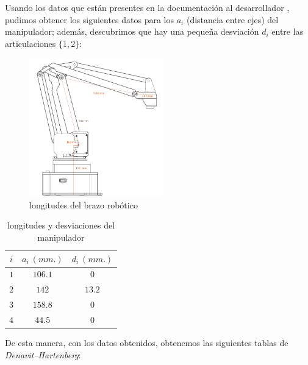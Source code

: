 \documentclass[a4paper,12pt]{article}
\begin{document}
Usando los datos que están presentes en la documentación al desarrollador \cite{developer_guide_uarm},
pudimos obtener los siguientes datos para los $a_i$ (distancia entre ejes) del manipulador; además,
descubrimos que hay una pequeña desviación $d_i$ entre las articulaciones $\{1, 2\}$:
\begin{figure}[H]
    \centering
    \includegraphics[height=6cm]{images/sizes.png}
    \caption{longitudes del brazo robótico \cite{developer_guide_uarm}}
    \label{fig:sizes}
\end{figure}

\begin{table}[H]
    \centering
    \begin{tabular}{|| c | c c ||}
        \hline
        $i$ & $a_i~(mm.)$ & $d_i~(mm.)$ \\ [0.5ex]
        \hline\hline
        $1$ & $106.1$ & $0$ \\
        \hline
        $2$ & $142$ & $13.2$ \\
        \hline
        $3$ & $158.8$ & $0$ \\
        \hline
        $4$ & $44.5$ & $0$ \\ [1ex]
        \hline
    \end{tabular}
    \caption{longitudes y desviaciones del manipulador}
\end{table}

De esta manera, con los datos obtenidos, obtenemos las siguientes tablas de \textit{Denavit–Hartenberg}:
\end{document}

